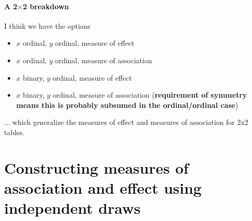 \documentclass[
  11pt,
  fleqn
]{article}
\begin{document}
\paragraph{A 2$\times$2 breakdown} I think we have the options
\begin{itemize}
  \item $x$ ordinal, $y$ ordinal, measure of effect
  \item $x$ ordinal, $y$ ordinal, measure of association
  \item $x$ binary, $y$ ordinal, measure of effect
  \item $x$ binary, $y$ ordinal, measure of association
    (\textbf{requirement of symmetry means this is probably subsumed
    in the ordinal/ordinal case})
\end{itemize}
... which generalize the measures of effect and measures of
association for 2x2 tables.

\section{Constructing measures of association and effect using
independent draws}
\end{document}
